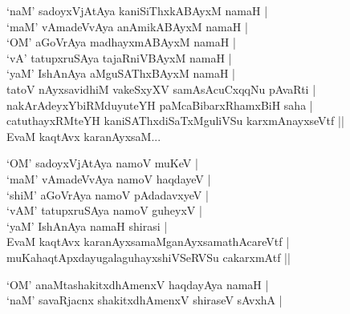 \begin{entry}
\medskip
\begin{shl}
`naM' sadoyxVjAtAya kaniSiThxkABAyxM namaH |\\
`maM' vAmadeVvAya anAmikABAyxM namaH |\\
`OM' aGoVrAya madhayxmABAyxM namaH |\\
`vA' tatupxruSAya tajaRniVBAyxM namaH |\\
`yaM' IshAnAya aMguSAThxBAyxM namaH |\\
tatoV nAyxsavidhiM vakeSxyXV samAsAcuCxqqNu pAvaRti |\\
nakArAdeyxYbiRMduyuteYH paMcaBibarxRhamxBiH saha |\\
catuthayxRMteYH kaniSAThxdiSaTxMguliVSu karxmAnayxseVtf ||\\
EvaM kaqtAvx karanAyxsaM...
\end{shl}
\medskip
{}
\medskip
{}
\medskip
\begin{shl}
`OM' sadoyxVjAtAya namoV muKeV |\\
`maM' vAmadeVvAya namoV haqdayeV |\\
`shiM' aGoVrAya namoV pAdadavxyeV |\\
`vAM' tatupxruSAya namoV guheyxV |\\
`yaM' IshAnAya namaH shirasi |\\
EvaM kaqtAvx karanAyxsamaMganAyxsamathAcareVtf |\\
muKahaqtApxdayugalaguhayxshiVSeRVSu cakarxmAtf ||
\end{shl}
\medskip
{}
\medskip
{}
\medskip
\begin{shl}
`OM' anaMtashakitxdhAmenxV haqdayAya namaH |\\
`naM' savaRjacnx shakitxdhAmenxV shiraseV sAvxhA |\\

\end{shl}
\end{entry}
